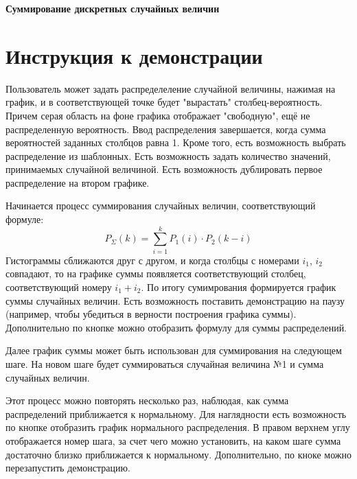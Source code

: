 \documentclass{article}
\begin{document}
\begin{center}
    \Huge{\textbf{Суммирование дискретных случайных величин \\[0.5in]}}
\end{center}




    \section{Инструкция к демонстрации}
    Пользователь может задать распределеление случайной величины, нажимая на график, и в соответствующей точке будет "вырастать" столбец-вероятность. Причем серая область на фоне графика отображает "свободную", ещё не распределенную вероятность. Ввод распределения завершается, когда сумма вероятностей заданных столбцов равна 1. Кроме того, есть возможность выбрать распределение из шаблонных. Есть возможность задать количество значений, принимаемых случайной величиной. Есть возможность дублировать первое распределение на втором графике. 

    Начинается процесс суммирования случайных величин, соответствующий формуле:
    \begin{equation}
        P_{\Sigma}(k) = \sum_{i=1}^{k}P_1(i) \cdot P_2(k-i)
    \end{equation}
    Гистограммы сближаются друг с другом, и когда столбцы с номерами $i_1$, $i_2$ совпадают, то на графике суммы появляется соответствующий столбец, соответствующий номеру $i_1 + i_2$. По итогу сумимрования формируется график суммы случайных величин. Есть возможность поставить демонстрацию на паузу (например, чтобы убедиться в верности построения графика суммы). Дополнительно по кнопке можно отобразить формулу для суммы распределений.

    Далее график суммы может быть использован для суммирования на следующем шаге. На новом шаге будет суммироваться случайная величина №1 и сумма случайных величин.

    Этот процесс можно повторять несколько раз, наблюдая, как сумма распределений приближается к нормальному.
    Для наглядности есть возможность по кнопке отобразить график нормального распределения. В правом верхнем углу  отображается номер шага, за счет чего можно установить, на каком шаге сумма достаточно близко приближается к нормальному. Дополнительно, по кноке можно перезапустить демонстрацию.
    
\end{document}
